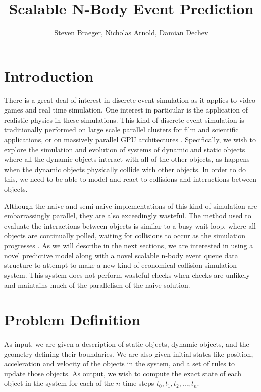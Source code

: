 \documentclass[CEJCS,PDF]{cej} %
\title{Scalable N-Body Event Prediction}
\author{Steven Braeger\inst{1}\email{steve@soapforge.com},
        Nicholas Arnold\inst{1}\email{narnold@knights.ucf.edu},
        Damian Dechev\inst{1}\email{damian.dechev@gmail.com}}
\institute{
     \inst{1} University of Central Florida,\\
     4000 Central Florida Blvd., 32816 Orlando, Florida, USA
          }
\begin{document}
\maketitle



\section{Introduction}

There is a great deal of interest in discrete event simulation as it applies to video games and real time simulation. One interest in particular is the application of realistic physics in these simulations.  This kind of discrete event simulation is traditionally performed on large scale parallel clusters for film and scientific applications, or on massively parallel GPU architectures \cite{grape,uberflow}.  Specifically, we wish to explore the simulation and evolution of systems of dynamic and static objects where all the dynamic objects interact with all of the other objects, as happens when the dynamic objects physically collide with other objects.  In order to do this, we need to be able to model and react to collisions and interactions between objects. 

Although the naive and semi-naive implementations of this kind of simulation are embarrassingly parallel, they are also exceedingly wasteful.  The method used to evaluate the interactions between objects is similar to a busy-wait loop, where all objects are continually polled, waiting for collisions to occur as the simulation progresses \cite{nbodycollisions,Moore88collisiondetection}.   As we will describe in the next sections, we are interested in using a novel predictive model along with a novel scalable n-body event queue data structure to attempt to make a new kind of economical collision simulation system.  This system does not perform wasteful checks when checks are unlikely and maintains much of the parallelism of the naive solution.

\section{Problem Definition}

As input, we are given a description of static objects, dynamic objects, and the geometry defining their boundaries.  We are also given initial states like position, acceleration and velocity of the objects in the system, and a set of rules to update those objects.  As output, we wish to compute the exact state of each object in the system for each of the $n$ time-steps $t_0, t_1, t_2, \ldots, t_n$.
\end{document}
